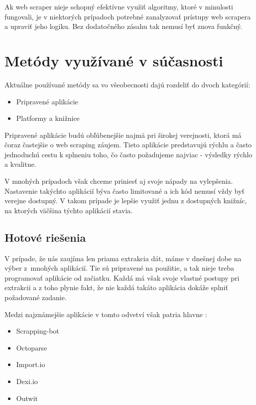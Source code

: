 Ak web scraper nieje schopný efektívne využiť algoritmy, ktoré v minulosti fungovali, je v niektorých prípadoch potrebné zanalyzovať prístupy web scrapera a upraviť jeho logiku. Bez dodatočného zásahu tak nemusí byť znova funkčný.

\section{Metódy využívané v súčasnosti}

Aktuálne používané metódy sa vo všeobecnosti dajú rozdeliť do dvoch kategórií:
\begin{itemize}
    \item {Pripravené aplikácie}
    \item {Platformy a knižnice}
\end{itemize}

\bigskip

Pripravené aplikácie budú obľúbenejšie najmä pri širokej verejnosti, ktorá má čoraz častejšie o web scraping záujem. Tieto aplikácie predstavujú rýchlu a často jednoduchú cestu k splneniu toho, čo často požadujeme najviac - výsledky rýchlo a kvalitne.

V mnohých prípadoch však chceme priniesť aj svoje nápady na vylepšenia. Nastavenie takýchto aplikácií býva často limitované a ich kód nemusí vždy byť verejne dostupný. V takom prípade je lepšie využiť jednu z dostupných knižníc, na ktorých väčšina týchto aplikácií stavia. 

\subsection{Hotové riešenia}
V prípade, že nás zaujíma len priama extrakcia dát, máme v dnešnej dobe na výber z~mnohých aplikácií. Tie sú pripravené na použitie, a tak nieje treba programovať aplikácie od začiatku. Každá má však svoje vlastné postupy pri extrakcii a z toho plynie fakt, že nie každá takáto aplikácia dokáže splniť požadované zadanie. 

\newpage
Medzi najznámejšie aplikácie v tomto odvetví však patria hlavne \cite{WebScrap}:

\begin{itemize}
    \item {Scrapping-bot}
    \item {Octoparse}
    \item {Import.io}
    \item {Dexi.io}
    \item {Outwit}
\end{itemize}

